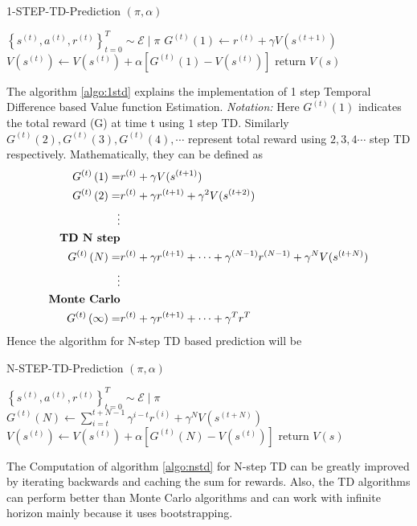 \documentclass[11pt]{article}
\begin{document}
\begin{algorithm}[H]
\caption{1-STEP-TD-Prediction $(\pi,\alpha)$}
\label{algo:1std}
\begin{algorithmic}[1]
\STATE $\left\{s^{(t)}, a^{(t)}, r^{(t)}\right\}_{t=0}^{T} \sim \mathcal{E} \mid \pi$
\STATE $G^{(t)}\left(1\right) \leftarrow r^{(t)} + \gamma V(s^{(t+1)})$
\STATE $V(s^{(t)}) \leftarrow V(s^{(t)}) + \alpha \left[ G^{(t)}(1) - V(s^{(t)}) \right]$
\ENDFOR
\ENDFOR
\STATE $\text{return } V(s) $
\end{algorithmic}
\end{algorithm}
The algorithm \ref{algo:1std} explains the implementation of 1 step Temporal Difference based Value function Estimation. \textit{Notation:} Here $G^{(t)}\left(1\right)$ indicates the total reward (G) at time t using $1$ step TD. Similarly $G^{(t)}\left(2\right), G^{(t)}\left(3\right), G^{(t)}\left(4\right), \cdots$ represent total reward using $2,3,4 \cdots$ step TD respectively. Mathematically, they can be defined as
\begin{equation*}
\begin{split}
    G^{(t)}\left(1\right) =& r^{(t)} + \gamma V(s^{(t+1)})\\
    G^{(t)}\left(2\right) =& r^{(t)} + \gamma r^{(t+1)} + \gamma ^2 V(s^{(t+2)})\\
    \vdots&\\
    \text{\textbf{TD N step}}&\\
    G^{(t)}\left(N\right) =& r^{(t)} + \gamma r^{(t+1)} + \cdots + \gamma ^{(N-1)} r^{(N-1)} +\gamma ^ N V(s^{(t + N)})\\
    \vdots&\\
    \text{\textbf{Monte Carlo}}&\\
    G^{(t)}\left(\infty\right) =& r^{(t)} + \gamma r^{(t+1)} + \cdots + \gamma ^{T} r^{T}\\
\end{split}
\end{equation*}
Hence the algorithm for N-step TD based prediction will be
\begin{algorithm}[H]
\caption{N-STEP-TD-Prediction $(\pi,\alpha)$}
\label{algo:nstd}
\begin{algorithmic}[1]
\STATE $\left\{s^{(t)}, a^{(t)}, r^{(t)}\right\}_{t=0}^{T} \sim \mathcal{E} \mid \pi$
\STATE $G^{(t)}\left(N\right) \leftarrow \sum_{i=t}^{t+N-1} \gamma^{i-t} r^{(i)} + \gamma^N V(s^{(t+N)})$
\STATE $V(s^{(t)}) \leftarrow V(s^{(t)}) + \alpha \left[ G^{(t)}(N) - V(s^{(t)}) \right]$
\ENDFOR
\ENDFOR
\STATE $\text{return } V(s) $
\end{algorithmic}
\end{algorithm}
The Computation of algorithm \ref{algo:nstd} for N-step TD can be greatly improved by iterating backwards and caching the sum for rewards. Also, the TD algorithms can perform better than Monte Carlo algorithms and can work with infinite horizon mainly because it uses bootstrapping.  
\newpage
\end{document}
